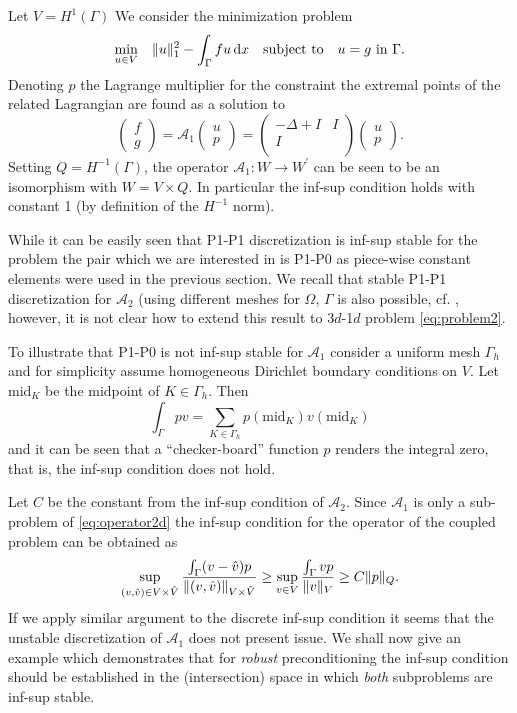 Let $V=H^1{(\Gamma)}$ We consider the minimization problem
\[
\min_{u\in V}\quad\lVert{u}\rVert^2_1 - \int_{\Gamma}f u\,\mathrm{d}x\quad\mbox{subject to}\quad
u=g\mbox{ in }\Gamma.
\]
Denoting $p$ the Lagrange multiplier for the constraint the extremal points
of the related Lagrangian are found as a solution to
%
\begin{equation}\label{eq:A1}
\begin{pmatrix}f\\g\end{pmatrix}=
\mathcal{A}_1\begin{pmatrix}u\\p\end{pmatrix}=
%
\begin{pmatrix}
  -\Delta + I & I\\
  I           &  \\
\end{pmatrix}
\begin{pmatrix}u\\p\end{pmatrix}.
\end{equation}
%
Setting $Q=H^{-1}(\Gamma)$, the operator $\mathcal{A}_1:W\rightarrow W^{\prime}$
can be seen to be an isomorphism with $W=V\times Q$. In particular the inf-sup
condition holds with constant 1 (by definition of the $H^{-1}$ norm).

While it can be easily seen that P1-P1 discretization is inf-sup stable for
the problem the pair which we are interested in is P1-P0 as piece-wise constant
elements were used in the previous section. We recall that stable P1-P1 discretization
for $\mathcal{A}_2$ (using different meshes for $\Omega$, $\Gamma$ is also possible,
cf. \cite{burman2009interior}, however, it is not clear how to extend this result
to 3$d$-1$d$ problem \eqref{eq:problem2}.

To illustrate that P1-P0 is not inf-sup stable for $\mathcal{A}_1$ consider
a uniform mesh $\Gamma_h$ and for simplicity assume homogeneous Dirichlet
boundary conditions on $V$. Let $\text{mid}_{K}$ be the midpoint of $K\in\Gamma_h$.
Then 
\[
\int_{\Gamma} p v = \sum_{K\in{\Gamma}_h}p(\text{mid}_{K})v(\text{mid}_{K})
\]
and it can be seen that a ``checker-board'' function $p$ renders the integral
zero, that is, the inf-sup condition does not hold.

Let $C$ be the constant from the inf-sup condition of $\mathcal{A}_2$. 
Since $\mathcal{A}_1$ is only a sub-problem of \eqref{eq:operator2d} the
inf-sup condition for the operator of the coupled problem can be obtained as
\[
\sup_{(v,\hat{v})\in V\times \hat{V}}\frac{\int_{\Gamma}(v-\hat{v}) p}{\lVert{(v,\hat{v})}\rVert_{V\times \hat{V}}}
\geq
\sup_{v\in V}\frac{\int_{\Gamma}v p}{\lVert{v}\rVert_{V}}
\geq
C\lVert{p}\rVert_Q.
\]
If we apply similar argument to the discrete inf-sup condition it seems
that the unstable discretization of $\mathcal{A}_1$ does not present issue.
We shall now give an example which demonstrates that for \emph{robust} preconditioning
the inf-sup condition should be established in the (intersection) space in which \emph{both}
subproblems are inf-sup stable.

